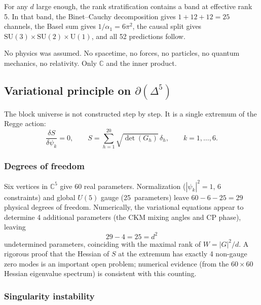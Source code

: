 \documentclass[12pt]{article}
\theoremstyle{remark}
\theoremstyle{definition}
\newcommand{\CC}{\mathbb{C}}
\begin{document}
For any $d$ large enough, the rank stratification contains a band at effective rank 5. In that band, the Binet--Cauchy decomposition gives $1 + 12 + 12 = 25$ channels, the Basel sum gives $1/\alpha_1 = 6\pi^2$, the causal split gives $\text{SU}(3) \times \text{SU}(2) \times \text{U}(1)$, and all 52 predictions follow.

No physics was assumed. No spacetime, no forces, no particles, no quantum mechanics, no relativity. Only $\CC$ and the inner product.

\subsection{Variational principle on $\partial(\Delta^5)$}
\label{sec:variational}

The block universe is not constructed step by step.  It is a single extremum of the Regge action:
\begin{equation}
\frac{\delta S}{\delta\psi_k} = 0, \qquad S = \sum_{h=1}^{20} \sqrt{\det(G_h)}\,\delta_h, \qquad k = 1,\ldots,6.
\end{equation}

\subsubsection{Degrees of freedom}

Six vertices in $\CC^5$ give $60$ real parameters.  Normalization ($|{\psi_k}|^2 = 1$, 6 constraints) and global $U(5)$ gauge (25~parameters) leave $60 - 6 - 25 = 29$ physical degrees of freedom.  Numerically, the variational equations appear to determine 4 additional parameters (the CKM mixing angles and CP phase), leaving
\begin{equation}
29 - 4 = 25 = d^2
\end{equation}
undetermined parameters, coinciding with the maximal rank of $W = |G|^2/d$.  A rigorous proof that the Hessian of $S$ at the extremum has exactly 4 non-gauge zero modes is an important open problem; numerical evidence (from the $60\times60$ Hessian eigenvalue spectrum) is consistent with this counting.

\subsubsection{Singularity instability}
\end{document}
